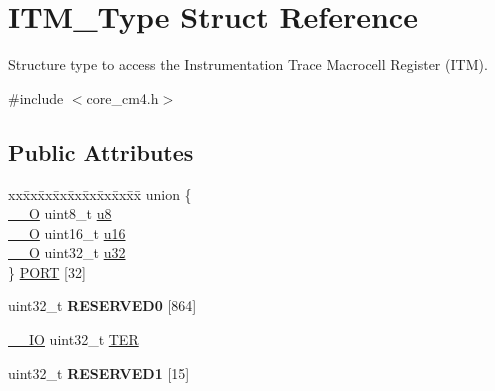 \hypertarget{struct_i_t_m___type}{}\section{I\+T\+M\+\_\+\+Type Struct Reference}
\label{struct_i_t_m___type}


Structure type to access the Instrumentation Trace Macrocell Register (I\+TM).  




{\ttfamily \#include $<$core\+\_\+cm4.\+h$>$}

\subsection*{Public Attributes}
\begin{DoxyCompactItemize}
\item 
\begin{tabbing}
xx\=xx\=xx\=xx\=xx\=xx\=xx\=xx\=xx\=\kill
union \{\\
\>\hyperlink{core__cm4_8h_a7e25d9380f9ef903923964322e71f2f6}{\_\_O} uint8\_t \hyperlink{struct_i_t_m___type_abea77b06775d325e5f6f46203f582433}{u8}\\
\>\hyperlink{core__cm4_8h_a7e25d9380f9ef903923964322e71f2f6}{\_\_O} uint16\_t \hyperlink{struct_i_t_m___type_a12aa4eb4d9dcb589a5d953c836f4e8f4}{u16}\\
\>\hyperlink{core__cm4_8h_a7e25d9380f9ef903923964322e71f2f6}{\_\_O} uint32\_t \hyperlink{struct_i_t_m___type_a6882fa5af67ef5c5dfb433b3b68939df}{u32}\\
\} \hyperlink{struct_i_t_m___type_afe056e8c8f8c5519d9b47611fa3a4c46}{PORT} \mbox{[}32\mbox{]}\\

\end{tabbing}\item 
uint32\+\_\+t {\bfseries R\+E\+S\+E\+R\+V\+E\+D0} \mbox{[}864\mbox{]}\hypertarget{struct_i_t_m___type_a2c5ae30385b5f370d023468ea9914c0e}{}\label{struct_i_t_m___type_a2c5ae30385b5f370d023468ea9914c0e}

\item 
\hyperlink{core__cm4_8h_aec43007d9998a0a0e01faede4133d6be}{\+\_\+\+\_\+\+IO} uint32\+\_\+t \hyperlink{struct_i_t_m___type_a91a040e1b162e1128ac1e852b4a0e589}{T\+ER}
\item 
uint32\+\_\+t {\bfseries R\+E\+S\+E\+R\+V\+E\+D1} \mbox{[}15\mbox{]}\hypertarget{struct_i_t_m___type_afffce5b93bbfedbaee85357d0b07ebce}{}\label{struct_i_t_m___type_afffce5b93bbfedbaee85357d0b07ebce}


\end{DoxyCompactItemize}
